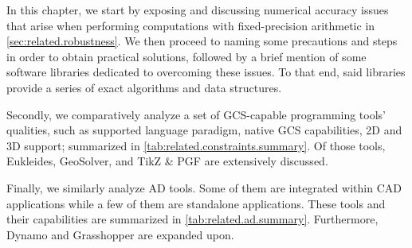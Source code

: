 \cleardoublepage
\label{chap:related}

\noindent
In this chapter, we start by exposing and discussing numerical accuracy issues
that arise when performing computations with fixed-precision arithmetic in
\cref{sec:related.robustness}.  We then proceed to naming some precautions and
steps in order to obtain practical solutions, followed by a brief mention of
some software libraries dedicated to overcoming these issues.  To that end, said
libraries provide a series of exact algorithms and data structures.

Secondly, we comparatively analyze a set of \ac{GCS}-capable programming tools'
qualities, such as supported language paradigm, native \ac{GCS} capabilities, 2D
and 3D support; summarized in \cref{tab:related.constraints.summary}.  Of those
tools, Eukleides, GeoSolver, and \acs{TikZ} \& \acs{PGF} are extensively
discussed.

Finally, we similarly analyze \ac{AD} tools.  Some of them are integrated within
\ac{CAD} applications while a few of them are standalone applications.  These
tools and their capabilities are summarized in \cref{tab:related.ad.summary}.
Furthermore, Dynamo and Grasshopper are expanded upon.




